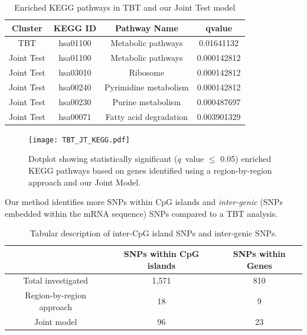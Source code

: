 \documentclass[hidelinks]{article}
\begin{document}
\begin{table}[!ht]
\begin{center}
\begin{tabular}{| c | c | c | c |}
\hline
Cluster & KEGG ID & Pathway Name & qvalue \\ \hline\hline
TBT & hsa01100 & Metabolic pathways & 0.01641132 \\ \hline
Joint Test & hsa01100 & Metabolic pathways & 0.000142812 \\
Joint Test & hsa03010 & Ribosome & 0.000142812 \\
Joint Test & hsa00240 & Pyrimidine metabolism & 0.000142812 \\
Joint Test & hsa00230 & Purine metabolism & 0.000487697 \\
Joint Test & hsa00071 & Fatty acid degradation & 0.003901329 \\
\hline\hline
\end{tabular}
\end{center}
\caption{Enriched KEGG pathways in TBT and our Joint Test model}
\end{table}

\begin{center}
\begin{figure}[H]
\texttt{[image: TBT\_JT\_KEGG.pdf]}
\caption{Dotplot showing statistically significant ($q$~value $\leq$ 0.05) enriched KEGG pathways based on genes identified using a region-by-region approach and our Joint Model.}
\end{figure}
\end{center}

Our method identifies more SNPs within CpG islands and \emph{inter-genic} (SNPs embedded within the mRNA sequence) SNPs compared to a TBT analysis. 

\begin{table}[H]
\begin{center}
\begin{tabular}{| c | c | c |}
\hline
& SNPs within CpG islands & SNPs within Genes\\ \hline \hline
Total investigated & 1,571 & 810 \\ \hline
Region-by-region approach & 18 & 9 \\ \hline
Joint model & 96 & 23 \\
\hline\hline
\end{tabular}
\end{center}
\caption{Tabular description of inter-CpG island SNPs and inter-genic SNPs.}
\end{table}
\end{document}
